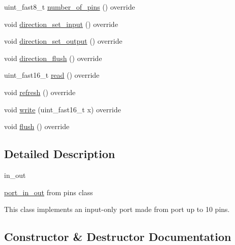 \begin{DoxyCompactItemize}
\item 
uint\+\_\+fast8\+\_\+t \hyperlink{classhwlib_1_1port__in__out__from__pins__t_a06fa8cbc11dc64651e8214e4217b2453}{number\+\_\+of\+\_\+pins} () override
\item 
void \hyperlink{classhwlib_1_1port__in__out__from__pins__t_acdd41d7b0788c259ef2a7a62ea9476ea}{direction\+\_\+set\+\_\+input} () override
\item 
void \hyperlink{classhwlib_1_1port__in__out__from__pins__t_a2fb1966c582d06ecaa8ba67ab6fe2be0}{direction\+\_\+set\+\_\+output} () override
\item 
void \hyperlink{classhwlib_1_1port__in__out__from__pins__t_afe4c9b2ae4b70627cb11ab296211b7f3}{direction\+\_\+flush} () override
\item 
uint\+\_\+fast16\+\_\+t \hyperlink{classhwlib_1_1port__in__out__from__pins__t_a2e645477ddba8954d3117a62703f170c}{read} () override
\item 
void \hyperlink{classhwlib_1_1port__in__out__from__pins__t_a0a9b4ffd9faed2aaec708141e699545c}{refresh} () override
\item 
void \hyperlink{classhwlib_1_1port__in__out__from__pins__t_a38b742fa3bcaa474b5beaeb71a5c364a}{write} (uint\+\_\+fast16\+\_\+t x) override
\item 
void \hyperlink{classhwlib_1_1port__in__out__from__pins__t_ad93519fe8087b7b65f35442f8c505ccf}{flush} () override
\end{DoxyCompactItemize}


\subsection{Detailed Description}
in\+\_\+out 

\hyperlink{classhwlib_1_1port__in__out}{port\+\_\+in\+\_\+out} from pins class

This class implements an input-\/only port made from port up to 10 pins. 

\subsection{Constructor \& Destructor Documentation}
\mbox{\label{classhwlib_1_1port__in__out__from__pins__t_a5a65089492691a823187bac2bf2e08a3}} 
